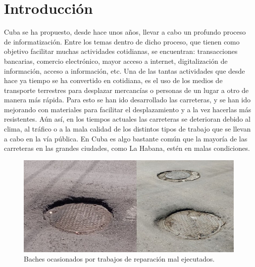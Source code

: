 \chapter*{Introducción}\label{chapter:introduction}

Cuba se ha propuesto, desde hace unos años, llevar a cabo un profundo proceso de informatización.
Entre los temas dentro de dicho proceso, que tienen como objetivo facilitar muchas actividades
cotidianas, se encuentran: transacciones bancarias, comercio electrónico, mayor acceso a internet, digitalización
de información, acceso a información, etc. Una de las tantas actividades que desde hace ya tiempo se ha convertido en
cotidiana, es el uso de los medios de transporte terrestres para desplazar mercancías o personas de un lugar a otro de
manera más rápida. Para esto se han ido desarrollado las carreteras, y se han ido mejorando con materiales para facilitar
el desplazamiento y a la vez hacerlas más resistentes. Aún así, en los tiempos actuales las carreteras se deterioran
debido al clima, al tráfico o a la mala calidad de los distintos tipos de trabajo que se llevan a cabo en la vía
pública. En Cuba es algo bastante común que la mayoría de las carreteras en las grandes ciudades, como La Habana,
estén en malas condiciones.\\

\begin{figure}[htb]
	\centering
	\includegraphics[scale=0.45]{Graphics/pothole_due_to_bad_job_1}
	\caption{Baches ocasionados por trabajos de reparación mal ejecutados.}
	\label{fig:1}
\end{figure}

